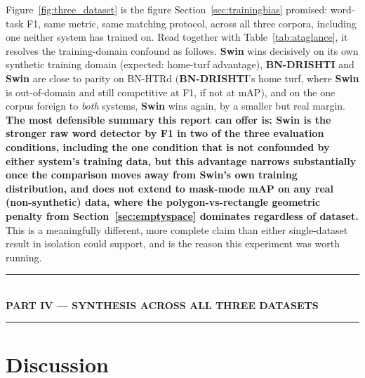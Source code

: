 \documentclass[11pt]{article}
\newcommand{\swin}{\textbf{Swin}}
\newcommand{\bnd}{\textbf{BN-DRISHTI}}
\newcommand{\partbanner}[1]{%
\bigskip
\begin{center}
\rule{0.96\linewidth}{1.1pt}\\[5pt]
{\Large\bfseries #1}\\[3pt]
\rule{0.96\linewidth}{1.1pt}
\end{center}
\bigskip
}
\begin{document}
Figure~\ref{fig:three_dataset} is the figure Section~\ref{sec:trainingbias} promised:
word-task F1, same metric, same matching protocol, across all three corpora, including
one neither system has trained on. Read together with
Table~\ref{tab:ataglance}, it resolves the training-domain confound as follows.
\swin{} wins decisively on its own synthetic training domain (expected: home-turf
advantage), \bnd{} and \swin{} are close to parity on BN-HTRd (\bnd's home turf,
where \swin{} is out-of-domain and still competitive at F1, if not at mAP), and on the
one corpus foreign to \emph{both} systems, \swin{} wins again, by a smaller but real
margin. \textbf{The most defensible summary this report can offer is: \swin{} is the
stronger raw word detector by F1 in two of the three evaluation conditions, including
the one condition that is not confounded by either system's training data, but this
advantage narrows substantially once the comparison moves away from \swin's own
training distribution, and does not extend to mask-mode mAP on any real (non-synthetic)
data, where the polygon-vs-rectangle geometric penalty from Section~\ref{sec:emptyspace}
dominates regardless of dataset.} This is a meaningfully different, more complete
claim than either single-dataset result in isolation could support, and is the reason
this experiment was worth running.

\partbanner{PART IV --- SYNTHESIS ACROSS ALL THREE DATASETS}

\section{Discussion}\label{sec:discussion}
\end{document}
